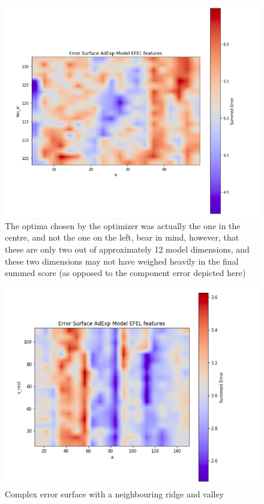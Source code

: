 \begin{figure}
    \centering
    \includegraphics[scale=1.25]{figures/adexp_efel_problem.png}
    \caption[A very complicated but not hopeless error surfaces]{The optima chosen by the optimizer was actually the one in the centre, and not the one on the left, bear in mind, however, that these are only two out of approximately 12 model dimensions, and these two dimensions may not have weighed heavily in the final summed score (as opposed to the component error depicted here)}
    \label{fig:real_problem_nontrivial_surface}
\end{figure}

\begin{figure}
    \centering
    \includegraphics[scale=1.25]{figures/third_error_surface.png}
        \caption[Complex but not hopeless error surfaces]{Complex error surface with a neighbouring ridge and valley}
    \label{fig:real_problem_nontrivial_surface}
\end{figure}

